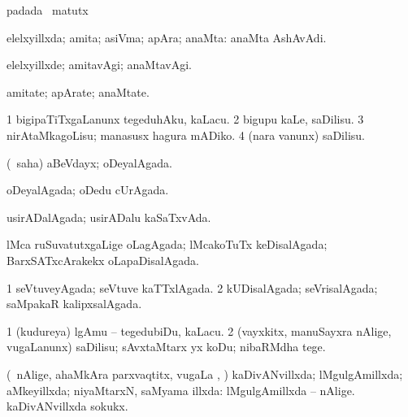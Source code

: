 {\bentry
{} 
\gl{\kirx}
\expl{}
\bmng
{} padada \BU\ matutx \BUkaq 
\emng
\eentry

\bentry
{} 
\gl{\gu}
\expl{}
\bmng
elelxyillxda; amita; asiVma; apAra; anaMta:  anaMta AshAvAdi. 
\emng
\eentry

\bentry
{} 
\gl{\kirxvi}
\expl{}
\bmng
elelxyillxde; amitavAgi; anaMtavAgi. 
\emng
\eentry

\bentry
{} 
\gl{\nA}
\expl{}
\bmng
amitate; apArate; anaMtate. 
\emng
\eentry

\bentry
{} 
\gl{\sakirx}
\expl{}
\bmng
\bnum
\num{1} bigipaTiTxgaLanunx tegeduhAku, kaLacu. 
\num{2} bigupu kaLe, saDilisu. 
\num{3} nirAtaMkagoLisu; manasusx hagura mADiko. 
\num{4} (nara \mo vanunx) saDilisu. 
\enum
\emng
\eentry

\bentry
{} 
\gl{\gu}
\expl{}
\bmng
(\rUpa\ saha) aBeVdayx; oDeyalAgada. 
\emng
\eentry

\bentry
{} 
\gl{\gu}
\expl{}
\bmng
oDeyalAgada; oDedu cUrAgada. 
\emng
\eentry

\bentry
{} 
\gl{\gu}
\expl{}
\bmng
usirADalAgada; usirADalu kaSaTxvAda. 
\emng
\eentry

\bentry
{} 
\gl{\gu}
\expl{}
\bmng
lMca ruSuvatutxgaLige oLagAgada; lMcakoTuTx keDisalAgada; BarxSATxcArakekx oLapaDisalAgada. 
\emng
\eentry

\bentry
{} 
\gl{\gu}
\expl{}
\bmng
\bnum
\num{1} seVtuveyAgada; seVtuve kaTTxlAgada. 
\num{2} kUDisalAgada; seVrisalAgada; saMpakaR kalipxsalAgada. 
\enum
\emng
\eentry

\bentry
{} 
\gl{\sakirx}
\expl{}
\bmng
\bnum
\num{1} (kudureya) lgAmu -- tegedubiDu, kaLacu. 
\num{2} (vayxkitx, manuSayxra nAlige, \mo vugaLanunx) saDilisu; sAvxtaMtarx yx koDu; nibaRMdha tege. 
\enum
\emng
\eentry

\bentry
{} 
\gl{\gu}
\expl{}
\bmng
(\kanmu\ nAlige, ahaMkAra parxvaqtitx, \mo vugaLa \vi, \rUpa) kaDivANvillxda; lMgulgAmillxda; aMkeyillxda; niyaMtarxN, saMyama illxda:  lMgulgAmillxda -- nAlige.  kaDivANvillxda sokukx. 
\emng
\eentry

}
